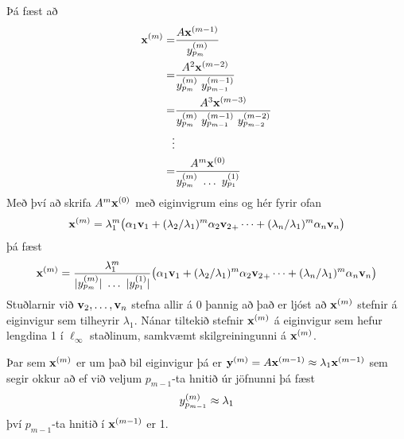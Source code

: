 \documentclass[letterpaper,10pt,icelandic]{sphinxmanual}
\begin{document}
Þá fæst að
\begin{gather}
\begin{split}\begin{aligned}
{\bf x}^{(m)}
=& \frac{A{\bf x}^{(m-1)}}{y_{p_m}^{(m)}} \\
=& \frac{A^2{\bf x}^{(m-2)}}{y_{p_m}^{(m)} \ y_{p_{m-1}}^{(m-1)}}\\
=& \frac{A^3{\bf x}^{(m-3)}}{y_{p_m}^{(m)} \ y_{p_{m-1}}^{(m-1)} \ y_{p_{m-2}}^{(m-2)}}\\
\vdots & \\
=& \frac{A^m{\bf x}^{(0)}}{y_{p_m}^{(m)} \ \dots \ y_{p_{1}}^{(1)}}
\end{aligned}\end{split}\notag
\end{gather}
Með því að skrifa \(A^m{\bf x}^{(0)}\) með eiginvigrum eins og hér fyrir ofan
\begin{gather}
\begin{split}{\mbox{${\bf x}$}}^{(m)}=  \lambda_1^m
\big(\alpha_1{\mbox{${\bf v}$}}_1+(\lambda_2/\lambda_1)^m\alpha_2{\mbox{${\bf v}_2$}}_+\cdots+
(\lambda_n/\lambda_1)^m \alpha_n{\mbox{${\bf v}$}}_n\big)\end{split}\notag
\end{gather}
þá fæst
\begin{gather}
\begin{split}{\bf x}^{(m)}
 = \frac{\lambda_1^m}{|y_{p_m}^{(m)}| \ \dots \ |y_{p_{1}}^{(1)}|}
\big(\alpha_1{\mbox{${\bf v}$}}_1+(\lambda_2/\lambda_1)^m\alpha_2{\mbox{${\bf v}_2$}}_+\cdots+
(\lambda_n/\lambda_1)^m \alpha_n{\mbox{${\bf v}$}}_n\big)\end{split}\notag
\end{gather}
Stuðlarnir við \({\bf v}_2,\ldots,{\bf v}_n\) stefna allir á 0 þannig að það er ljóst að \({\bf x}^{(m)}\)
stefnir á eiginvigur sem tilheyrir \(\lambda_1\). Nánar tiltekið stefnir \({\bf x}^{(m)}\) á eiginvigur
sem hefur lengdina 1 í \(\ell_\infty\) staðlinum, samkvæmt skilgreiningunni á \({\bf x}^{(m)}\).

Þar sem \({\bf x}^{(m)}\) er um það bil eiginvigur þá er
\({\bf y}^{(m)} = A{\bf x}^{(m-1)} \approx \lambda_1 {\bf x}^{(m-1)}\) sem segir okkur
að ef við veljum \(p_{m-1}\)-ta hnitið úr jöfnunni þá fæst
\begin{gather}
\begin{split}y_{p_{m-1}}^{(m)} \approx \lambda_1\end{split}\notag
\end{gather}
því \(p_{m-1}\)-ta hnitið í \({\bf x}^{(m-1)}\) er 1.
\end{document}
